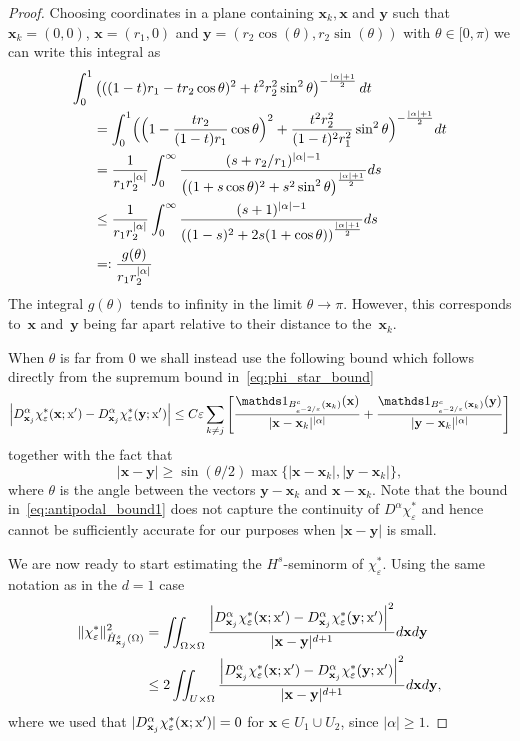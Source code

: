 \documentclass[AHL, Unicode, longabstracts, published]{cedram}
\newcommand*\eps{\varepsilon}
\newcommand\1{{\ensuremath {\mathds 1} }}
\newcommand{\bx}{\mathbf{x}}
\newcommand{\by}{\mathbf{y}}
\newcommand{\sx}{\textup{x}}
\begin{document}
\begin{proof}
Choosing coordinates in a plane containing $\bx_k, \bx$ and $\by$ such that $\bx_k=(0, 0)$, $\bx=(r_1, 0)$ and $\by=(r_2\cos(\theta), r_2 \sin(\theta))$ with $\theta \in [0, \pi)$ we can write this integral as
\begin{align*}
\int_0^1 &\left(((1-t)r_1-t r_2\cos\theta)^2+t^2r_2^2\sin^2\theta\right)^{-\frac{|\alpha|+1}{2}}dt\\
&=
\int_0^1 \Bigl(\Bigl(1-\frac{t r_2}{(1-t)r_1}\cos\theta\Bigr)^2+\frac{t^2r_2^2}{(1-t)^2r_1^2}\sin^2\theta\Bigr)^{-\frac{|\alpha|+1}{2}}dt\\
&=
\frac{1}{r_1 r_2^{|\alpha|}}\int_0^\infty \frac{(s+r_2/r_1)^{|\alpha|-1}}{\left((1+s \cos\theta)^2+s^2\sin^2\theta\right)^{\frac{|\alpha|+1}{2}}}ds\\
&\leq
\frac{1}{r_1 r_2^{|\alpha|}}\int_0^\infty \frac{(s+1)^{|\alpha|-1}}{\left((1-s)^2+2s(1+\cos\theta)\right)^{\frac{|\alpha|+1}{2}}}ds\\
&=:
\frac{g(\theta)}{r_1 r_2^{|\alpha|}}
\end{align*}
The integral $g(\theta)$ tends to infinity in the limit $\theta\to \pi$. However, this corresponds to~$\bx$ and~$\by$ being far apart relative to their distance to the~$\bx_k$.

When $\theta$ is far from $0$ we shall instead use the following bound which follows directly from the supremum bound in~\eqref{eq:phi_star_bound}
\begin{equation}\label{eq:antipodal_bound1}
\left|D_{\bx_j}^\alpha \chi_\eps^*(\bx; \sx')- D_{\bx_j}^\alpha \chi_\eps^*(\by; \sx')\right|
\leq C \eps \sum_{k\neq j}\left[\frac{\1_{B_{e^{-2/\eps}}^c(\bx_k)}(\bx)}{|\bx-\bx_k|^{|\alpha|}}+\frac{\1_{B_{e^{-2/\eps}}^c(\bx_k)}(\by)}{|\by-\bx_k|^{|\alpha|}}\right]
\end{equation}
together with the fact that
\begin{equation}\label{eq:antipodal_bound2}
|\bx- \by| \geq \sin(\theta/2)\max\{|\bx-\bx_k|, |\by-\bx_k|\},
\end{equation}
where $\theta$ is the angle between the vectors $\by-\bx_k$ and $\bx-\bx_k.$ Note that the bound in~\eqref{eq:antipodal_bound1} does not capture the continuity of $D^\alpha\chi_\eps^*$ and hence cannot be sufficiently accurate for our purposes when $|\bx-\by|$ is small.



We are now ready to start estimating the $H^s$-seminorm of $\chi_\eps^*$. Using the same notation as in the $d=1$ case
\begin{align*}
\|\chi_\eps^*\|_{\dot H^s_{\bx_j}(\Omega)}^2 &=
\iint_{\Omega\times \Omega}\frac{\left|D_{\bx_j}^\alpha\chi_\eps^*(\bx; \sx')-D_{\bx_j}^\alpha\chi_\eps^*(\by; \sx')\right|^2}{|\bx-\by|^{d+1}}d\bx d\by\\
&\leq 2\iint_{U\times \Omega}\frac{\left|D_{\bx_j}^\alpha\chi_\eps^*(\bx; \sx')-D_{\bx_j}^\alpha\chi_\eps^*(\by; \sx')\right|^2}{|\bx-\by|^{d+1}}d\bx d\by,
\end{align*}
where we used that $|D_{\bx_j}^\alpha \chi_\eps^*(\bx; \sx')|=0$ for $\bx \in U_1 \cup U_2$, since $|\alpha|\geq 1$.



\end{proof}
\end{document}
